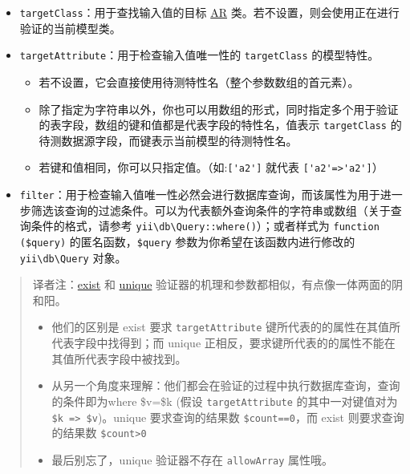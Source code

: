 \begin{itemize}
\item \lstinline|targetClass|：用于查找输入值的目标 \hyperref[db-active-record.md]{AR} 类。若不设置，则会使用正在进行验证的当前模型类。
\item \lstinline|targetAttribute|：用于检查输入值唯一性的 \lstinline|targetClass| 的模型特性。\begin{itemize}
\item 若不设置，它会直接使用待测特性名（整个参数数组的首元素）。
\item 除了指定为字符串以外，你也可以用数组的形式，同时指定多个用于验证的表字段，数组的键和值都是代表字段的特性名，值表示 \lstinline|targetClass| 的待测数据源字段，而键表示当前模型的待测特性名。
\item 若键和值相同，你可以只指定值。（如:\lstinline|['a2']| 就代表 \lstinline|['a2'=>'a2']|）
\end{itemize}

\item \lstinline|filter|：用于检查输入值唯一性必然会进行数据库查询，而该属性为用于进一步筛选该查询的过滤条件。可以为代表额外查询条件的字符串或数组（关于查询条件的格式，请参考 \texttt{yii{\allowbreak{}\textbackslash}db{\allowbreak{}\textbackslash}Query\allowbreak{}::\allowbreak{}where()}）；或者样式为 \lstinline|function ($query)| 的匿名函数，\lstinline|$query| 参数为你希望在该函数内进行修改的 \texttt{yii{\allowbreak{}\textbackslash}db{\allowbreak{}\textbackslash}Query} 对象。
\end{itemize}
\begin{quote}译者注：\hyperref[tutorial-core-validators.md::::exist]{exist} 和 \hyperref[tutorial-core-validators.md::::unique]{unique} 验证器的机理和参数都相似，有点像一体两面的阴和阳。

\begin{itemize}
\item 他们的区别是 exist 要求 \lstinline|targetAttribute| 键所代表的的属性在其值所代表字段中找得到；而 unique 正相反，要求键所代表的的属性不能在其值所代表字段中被找到。
\item 从另一个角度来理解：他们都会在验证的过程中执行数据库查询，查询的条件即为where \$v=\$k (假设 \lstinline|targetAttribute| 的其中一对键值对为 \lstinline|$k => $v|)。unique 要求查询的结果数 \lstinline|$count==0|，而 exist 则要求查询的结果数 \lstinline|$count>0|
\item 最后别忘了，unique 验证器不存在 \lstinline|allowArray| 属性哦。
\end{itemize}
\end{quote}
